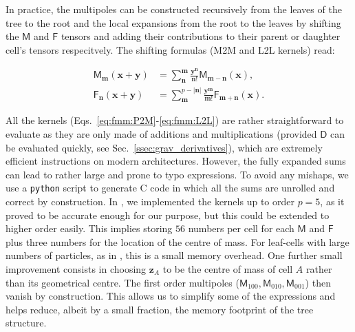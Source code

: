In practice, the multipoles can be constructed recursively from the
leaves of the tree to the root and the local expansions from the root
to the leaves by shifting the $\mathsf{M}$ and $\mathsf{F}$ tensors
and adding their contributions to their parent or daughter cell's
tensors respecitvely. The shifting formulas (M2M and L2L kernels)
read:

\begin{align}
  \mathsf{M}_{\mathbf{m}}(\mathbf{x} + \mathbf{y}) &=
  \sum_{\mathbf{n}}^{\mathbf{m}}
  \frac{\mathbf{y}^\mathbf{n}}{\mathbf{n}!}\mathsf{M}_{\mathbf{m} -
    \mathbf{n}}(\mathbf{x}), \label{eq:fmm:M2M} \\
  \mathsf{F}_{\mathbf{n}}(\mathbf{x} + \mathbf{y}) &=
  \sum_{\mathbf{m}}^{p-|\mathbf{n}|}
  \frac{\mathbf{y}^\mathbf{m}}{\mathbf{m}!}\mathsf{F}_{\mathbf{m} +
    \mathbf{n}}(\mathbf{x}). \label{eq:fmm:L2L} 
\end{align}

All the kernels (Eqs.~\ref{eq:fmm:P2M}-\ref{eq:fmm:L2L}) are rather
straightforward to evaluate as they are only made of additions and
multiplications (provided $\mathsf{D}$ can be evaluated quickly, see
Sec.~\ref{ssec:grav_derivatives}), which are extremely efficient
instructions on modern architectures. However, the fully expanded sums
can lead to rather large and prone to typo expressions. To avoid any
mishaps, we use a \texttt{python} script to generate C code in which
all the sums are unrolled and correct by construction. In \swift, we
implemented the kernels up to order $p=5$, as it proved to be accurate
enough for our purpose, but this could be extended to higher order
easily. This implies storing $56$ numbers per cell for each
$\textsf{M}$ and $\textsf{F}$ plus three numbers for the location of
the centre of mass. For leaf-cells with large numbers of particles, as
in \swift, this is a small memory overhead. One further small
improvement consists in choosing $\mathbf{z}_A$ to be the centre of
mass of cell $A$ rather than its geometrical centre. The first order
multipoles ($\mathsf{M}_{100},\mathsf{M}_{010},\mathsf{M}_{001}$) then
vanish by construction. This allows us to simplify some of the
expressions and helps reduce, albeit by a small fraction, the memory
footprint of the tree structure.
